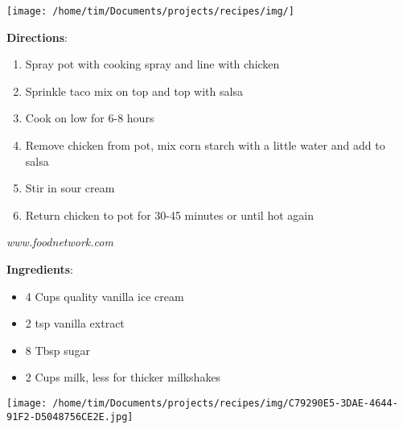 \documentclass[11pt, twoside, openany]{book}
\begin{document}
\begin{minipage}[t]{0.2\linewidth}
\centering \strut\vspace*{-\baselineskip}\newline
\texttt{[image: /home/tim/Documents/projects/recipes/img/]}\\
\end{minipage}\vspace{3mm}
\textbf{Directions}:
\vspace{-3mm}\begin{enumerate}\setlength\itemsep{-1mm}
\item Spray pot with cooking spray and line with chicken
\item Sprinkle taco mix on top and top with salsa
\item Cook on low for 6-8 hours
\item Remove chicken from pot, mix corn starch with a little water and add to salsa
\item Stir in sour cream 
\item Return chicken to pot for 30-45 minutes or until hot again
\end{enumerate}
 \label{vanilla-milkshake}\hfill\textit{www.foodnetwork.com}\\
\begin{minipage}[t]{0.8\linewidth}
\textbf{Ingredients}:\vspace{-3mm}
\begin{multicols}{2}
\begin{itemize}\setlength\itemsep{-1mm}
\item 4 Cups quality vanilla ice cream
\item 2 tsp vanilla extract
\item 8 Tbsp sugar
\item 2 Cups milk, less for thicker milkshakes
\end{itemize}
\end{multicols}
\end{minipage}
\begin{minipage}[t]{0.2\linewidth}
\centering \strut\vspace*{-\baselineskip}\newline
\texttt{[image: /home/tim/Documents/projects/recipes/img/C79290E5-3DAE-4644-91F2-D5048756CE2E.jpg]}\\
\end{minipage}\vspace{3mm}
\end{document}
